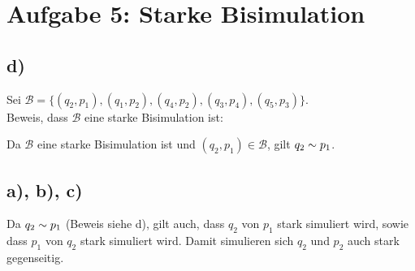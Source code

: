\section*{Aufgabe 5: Starke Bisimulation}

\subsection*{d)}

Sei $\mathcal{B} = \{(q_2, p_1),(q_1, p_2),(q_4,p_2),(q_3,p_4),(q_5,p_3)\}$. \\
Beweis, dass $\mathcal{B} $ eine starke Bisimulation ist:

\begin{compactitem}
\item {}
\item {}
\item {}
\item {}
\item {}
\end{compactitem}

Da $\mathcal{B}$ eine starke Bisimulation ist und $(q_2, p_1) \in \mathcal{B}$, gilt $q_2 \sim p_1$.
\subsection*{a), b), c)}
Da $q_2 \sim p_1$ (Beweis siehe d), gilt auch, dass $ q_2$ von $  p_1$ stark simuliert wird, sowie dass $p_1 $ von $ q_2$ stark simuliert wird. Damit simulieren sich $q_2$ und $p_2$ auch stark gegenseitig.
